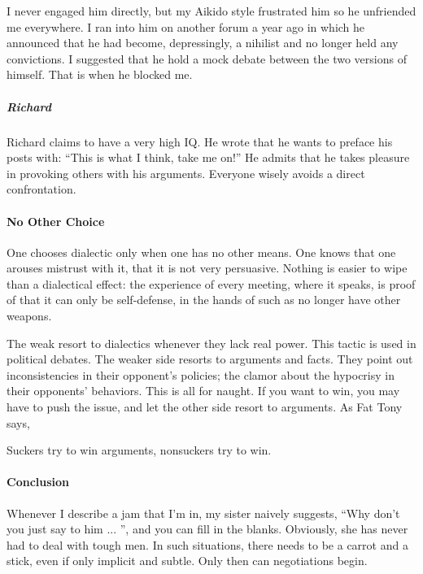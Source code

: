 I never engaged him directly, but my Aikido style frustrated him so he unfriended me everywhere. I ran into him on another forum a year ago in which he announced that he had become, depressingly, a nihilist and no longer held any convictions. I suggested that he hold a mock debate between the two versions of himself. That is when he blocked me.

\subparagraph{Richard}


Richard claims to have a very high IQ. He wrote that he wants to preface his posts with: ``This is what I think, take me on!'' He admits that he takes pleasure in provoking others with his arguments. Everyone wisely avoids a direct confrontation.

\paragraph{No Other Choice}


\begin{quotex}
One chooses dialectic only when one has no other means. One knows that one arouses mistrust with it, that it is not very persuasive. Nothing is easier to wipe than a dialectical effect: the experience of every meeting, where it speaks, is proof of that it can only be self-defense, in the hands of such as no longer have other weapons.
\end{quotex}


The weak resort to dialectics whenever they lack real power. This tactic is used in political debates. The weaker side resorts to arguments and facts. They point out inconsistencies in their opponent's policies; the clamor about the hypocrisy in their opponents' behaviors. This is all for naught. If you want to win, you may have to push the issue, and let the other side resort to arguments. As Fat Tony says,

\begin{quotex}
Suckers try to win arguments, nonsuckers try to win. 
\end{quotex}


\paragraph{Conclusion}


Whenever I describe a jam that I'm in, my sister naively suggests, ``Why don't you just say to him ... '', and you can fill in the blanks. Obviously, she has never had to deal with tough men. In such situations, there needs to be a carrot and a stick, even if only implicit and subtle. Only then can negotiations begin.

